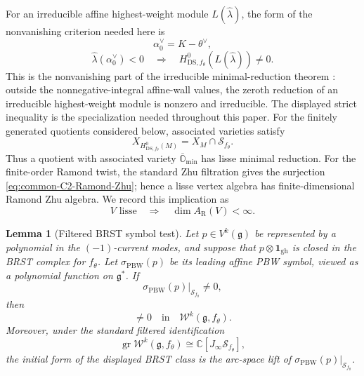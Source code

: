 \documentclass[11pt,reqno]{amsart}
\newtheorem{lemma}[theorem]{Lemma}
\theoremstyle{definition}
\theoremstyle{remark}
\begin{document}
For an irreducible affine highest-weight module
$L(\widehat\lambda)$, the form of the nonvanishing criterion needed here is
\begin{equation}
  \alpha_0^\vee=K-\theta^\vee,
  \label{eq:common-affine-simple-coroot}
\end{equation}
\begin{equation}
  \widehat\lambda(\alpha_0^\vee)<0
  \quad\Longrightarrow\quad
  H^0_{\mathrm{DS},f_\theta}\!\left(L(\widehat\lambda)\right)\ne0.
  \label{eq:common-DS-nonvanishing}
\end{equation}
This is the nonvanishing part of the irreducible minimal-reduction theorem
\cite[Theorem~6.7.4]{Arakawa2005}: outside the nonnegative-integral affine-wall
values, the zeroth reduction of an irreducible highest-weight module is
nonzero and irreducible.  The displayed strict inequality is the specialization
needed throughout this paper.
For the finitely generated quotients considered below, associated varieties
satisfy \cite[Theorem~6.1(3)]{ArakawaMoreau2018}
\begin{equation}
  X_{H^0_{\mathrm{DS},f_\theta}(M)}
  =X_M\cap\mathcal S_{f_\theta}.
  \label{eq:common-associated-variety}
\end{equation}
Thus a quotient with associated variety $\overline{\mathbb O}_{\min}$ has
lisse minimal reduction.  For the finite-order Ramond twist, the standard
Zhu filtration gives the surjection
\eqref{eq:common-C2-Ramond-Zhu}; hence a lisse vertex algebra has
finite-dimensional Ramond Zhu algebra.  We record this implication as
\begin{equation}
 V\text{ lisse}\quad\Longrightarrow\quad
 \dim A_{\mathrm R}(V)<\infty.
 \label{eq:common-lisse-Ramond-finite}
\end{equation}

\begin{lemma}[Filtered BRST symbol test]
\label{lem:common-filtered-BRST-symbol-test}
Let $p\in V^k(\mathfrak g)$ be represented by a polynomial in the
$(-1)$-current modes, and suppose that
$p\otimes\mathbf1_{\mathrm{gh}}$ is closed in the BRST complex for
$f_\theta$.  Let $\sigma_{\mathrm{PBW}}(p)$ be its leading affine PBW
symbol, viewed as a polynomial function on $\mathfrak g^*$.  If
\begin{equation}
 \left.\sigma_{\mathrm{PBW}}(p)\right|_{\mathcal S_{f_\theta}}
 \ne0,
 \label{eq:common-filtered-BRST-nonzero-restriction}
\end{equation}
then
\begin{equation*}
 [p\otimes\mathbf1_{\mathrm{gh}}]\ne0
 \quad\text{in}\quad
 \mathcal W^k(\mathfrak g,f_\theta).
\end{equation*}
Moreover, under the standard filtered identification
\begin{equation}
 \operatorname{gr}\mathcal W^k(\mathfrak g,f_\theta)
 \cong
 \mathbb C[J_\infty\mathcal S_{f_\theta}],
 \label{eq:common-filtered-BRST-associated-graded}
\end{equation}
the initial form of the displayed BRST class is the arc-space lift of
$\left.\sigma_{\mathrm{PBW}}(p)\right|_{\mathcal S_{f_\theta}}$.
\end{lemma}
\end{document}
